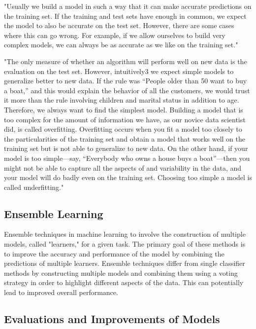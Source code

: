 "Usually we build a model in such a way that it can make accurate
predictions on the training set. If the training and test sets have
enough in common, we expect the model to also be accurate on the test
set. However, there are some cases where this can go wrong. For example,
if we allow ourselves to build very complex models, we can always be as
accurate as we like on the training set." 
\cite[p. 35]{muller_introductionmachinelearning_2016}

"The only measure of whether an algorithm will perform well on new data
is the evaluation on the test set. However, intuitively3 we expect simple models to generalize
better to new data. If the rule was “People older than 50 want to buy a
boat,” and this would explain the behavior of all the
customers, we would trust it more than the rule involving children and
marital status in addition to age. Therefore, we always want to find
the simplest model. Building a model that is too complex for the amount
of information we have, as our novice data scientist did, is called
overfitting. Overfitting occurs when you fit a model too closely to
the particularities of the training set and obtain a model that works
well on the training set but is not able to generalize to new data. On
the other hand, if your model is too simple—say, “Everybody who owns a
house buys a boat”—then you might not be able to capture all the
aspects of and variability in the data, and your model will do badly even
on the training set. Choosing too simple a model is called
underfitting."  \cite[p. 35]{muller_introductionmachinelearning_2016}

\subsection{Ensemble Learning}
Ensemble techniques in machine learning to involve the construction of multiple models, called "learners," for a given task. The primary goal of these methods is to improve the accuracy and performance of the model by combining the predictions of multiple learners. Ensemble techniques differ from single classifier methods by constructing multiple models and combining them using a voting strategy in order to highlight different aspects of the data. This can potentially lead to improved overall performance. \cite[p. 253]{shaik_briefsurveyrandom_2019}

\subsection{Evaluations and Improvements of Models}
